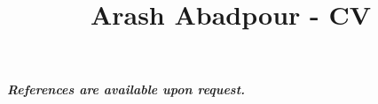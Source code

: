 \documentclass[12pt,a4paper]{moderncv}
\title{Arash Abadpour - CV}
\begin{document}
\maketitle

















\vspace{1cm}
\emph{\textbf{References are available upon request.}}


\end{document}

